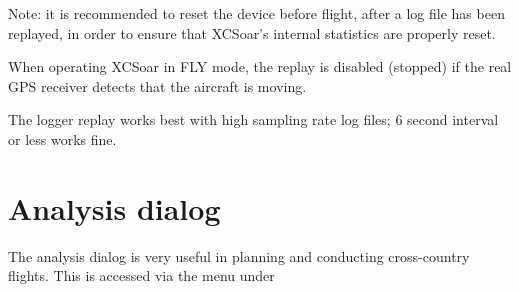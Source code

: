 \documentclass[a4paper,12pt]{refrep}
\begin{document}
Note: it is recommended to reset the device before flight, after a log
file has been replayed, in order to ensure that XCSoar's internal
statistics are properly reset.

When operating XCSoar in FLY mode, the replay is disabled (stopped) if
the real GPS receiver detects that the aircraft is moving.

The logger replay works best with high sampling rate log files;
6 second interval or less works fine.

\section{Analysis dialog}\label{sec:analysis-dialog-climb}

The analysis dialog is very useful in planning and conducting
cross-country flights.  This is accessed via the menu under
\begin{quote}
\blink{}
\end{quote}
\end{document}
